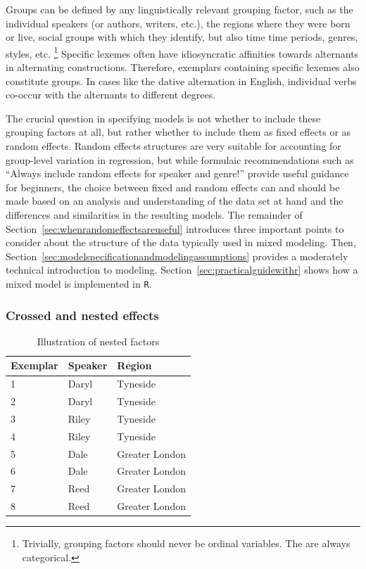 Groups can be defined by any linguistically relevant grouping factor, such as the individual speakers (or authors, writers, etc.), the regions where they were born or live, social groups with which they identify, but also time time periods, genres, styles, etc.%
\footnote{Trivially, grouping factors should never be ordinal variables.
The are always categorical.}
Specific lexemes often have idiosyncratic affinities towards alternants in alternating constructions.
Therefore, exemplars containing specific lexemes also constitute groups.
In cases like the dative alternation in English, individual verbs co-occur with the alternants to different degrees.

The crucial question in specifying models is not whether to include these grouping factors at all, but rather whether to include them as fixed effects or as random effects.
Random effects structures are very suitable for accounting for group-level variation in regression, but while formulaic recommendations such as ``Always include random effects for speaker and genre!'' provide useful guidance for beginners, the choice between fixed and random effects can and should be made based on an analysis and understanding of the data set at hand and the differences and similarities in the resulting models.
The remainder of Section~\ref{sec:whenrandomeffectsareuseful} introduces three important points to consider about the structure of the data typically used in mixed modeling.
Then, Section~\ref{sec:modelspecificationandmodelingassumptions} provides a moderately technical introduction to modeling.
Section~\ref{sec:practicalguidewithr} shows how a mixed model is implemented in \texttt{R}.


\subsubsection{Crossed and nested effects}
\label{sec:crossedandnestedeffects}

\begin{table}
  \centering
  \begin{tabular}{lll}
    \toprule
    \textbf{Exemplar} & \textbf{Speaker}  & \textbf{Region}        \\
    \midrule
                    1 &           Daryl  &         Tyneside       \\
                    2 &           Daryl  &         Tyneside       \\
                    3 &           Riley  &         Tyneside       \\
                    4 &           Riley  &         Tyneside       \\
                    5 &           Dale   &         Greater London \\
                    6 &           Dale   &         Greater London \\
                    7 &           Reed   &         Greater London \\
                    8 &           Reed   &         Greater London \\
    \bottomrule
  \end{tabular}
  \caption{Illustration of nested factors}
  \label{tab:nested}
\end{table}

